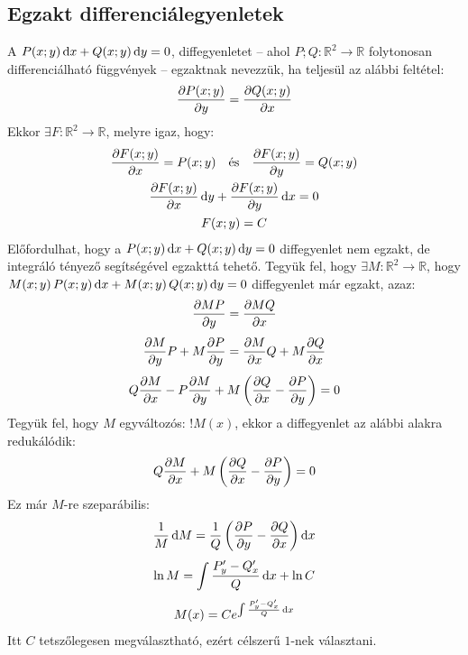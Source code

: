 \documentclass[main.tex]{subfiles}
\begin{document}
\subsection{Egzakt differenciálegyenletek}

A $P(x;y) \,\mathrm{d} x + Q(x;y) \,\mathrm{d} y = 0$,
diffegyenletet – ahol $P;Q : \mathbb{R}^2 \rightarrow
  \mathbb{R}$ folytonosan differenciálható függvények
– egzaktnak nevezzük, ha teljesül az alábbi feltétel:
\begin{equation*}
  \partialderivative{P(x;y)}{y} = \partialderivative{Q(x;y)}{x}
\end{equation*}
Ekkor $\exists F : \mathbb{R}^2 \rightarrow \mathbb{R}$,
melyre igaz, hogy:
\begin{gather*}
  \partialderivative{F(x;y)}{x} = P(x;y)
  \quad \text{és} \quad
  \partialderivative{F(x;y)}{y} = Q(x;y)
  \\
  \partialderivative{F(x;y)}{x}   \, \differential y
  + \partialderivative{F(x;y)}{y} \, \differential x
  = 0
  \\
  F(x;y) = C
\end{gather*}
Előfordulhat, hogy a $P(x;y) \,\mathrm{d} x
  + Q(x;y) \,\mathrm{d} y = 0$ diffegyenlet
nem egzakt, de integráló tényező segítségével
egzakttá tehető. Tegyük fel, hogy $\exists M :
  \mathbb{R}^2 \rightarrow \mathbb{R}$, hogy
$M(x;y) \, P(x;y) \, \mathrm{d} x + M(x;y)
  \, Q(x;y) \, \mathrm{d} y = 0$ diffegyenlet
már egzakt, azaz:
\begin{gather*}
  \partialderivative{MP}{y} = \partialderivative{MQ}{x}
  \\[.33em]
  \partialderivative{M}{y} P
  + M \partialderivative{P}{y}
  = \partialderivative{M}{x} Q
  + M \partialderivative{Q}{x}
  \\[.33em]
  Q \partialderivative{M}{x}
  - P \partialderivative{M}{y}
  + M \left(
  \partialderivative{Q}{x}
  - \partialderivative{P}{y}
  \right) = 0
\end{gather*}
Tegyük fel, hogy $M$ egyváltozós: $!M(x)$, ekkor
a diffegyenlet az alábbi alakra redukálódik:
\begin{equation*}
  Q \partialderivative{M}{x}
  + M \left(
  \partialderivative{Q}{x}
  - \partialderivative{P}{y}
  \right) = 0
\end{equation*}
Ez már $M$-re szeparábilis:
\begin{gather*}
  \frac{1}{M} \, \differential M
  = \frac{1}{Q} \left(
  \partialderivative{P}{y}
  - \partialderivative{Q}{x}
  \right) \differential x
  \\[.33em]
  \ln M
  = \int \frac{P_y' - Q_x'}{Q} \, \differential x + \ln C
  \\[.33em]
  M(x) = C e^{\int \frac{P_y' - Q_x'}{Q} \, \differential x}
\end{gather*}
Itt $C$ tetszőlegesen megválasztható, ezért
célszerű $1$-nek választani.
\end{document}
